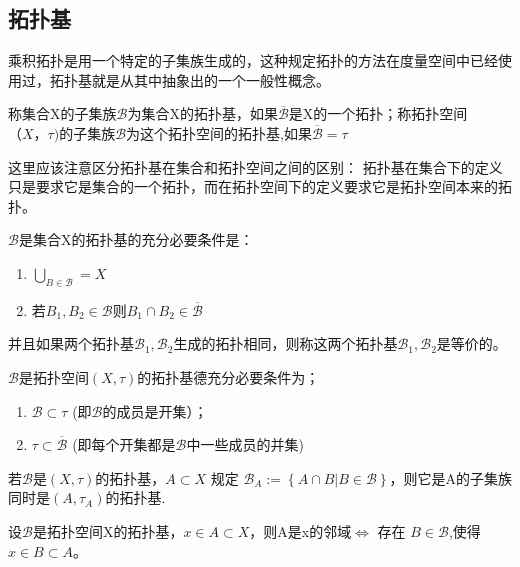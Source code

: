 \subsection*{拓扑基}
乘积拓扑是用一个特定的子集族生成的，这种规定拓扑的方法在度量空间中已经使用过，拓扑基就是从其中抽象出的一个一般性概念。
\begin{definition}
    称集合X的子集族\(\mathscr{B}\)为集合X的拓扑基，如果\(\overline{\mathscr{B}}\)是X的一个拓扑；称拓扑空间\(（X，\tau ) \)的子集族\(\mathscr{B}\)为这个拓扑空间的拓扑基,如果\(\overline{\mathscr{B}}= \tau\)
\end{definition}
\begin{note}
    这里应该注意区分拓扑基在集合和拓扑空间之间的区别： 拓扑基在集合下的定义只是要求它是集合的一个拓扑，而在拓扑空间下的定义要求它是拓扑空间本来的拓扑。
\end{note}
\begin{corollary}
    \(\mathscr{B}\)是集合X的拓扑基的充分必要条件是： 
    \begin{enumerate}
        \item \(\bigcup_{B \in \mathscr{B}} = X \) \\
        \item 若\(B_1,B_2 \in \mathscr{B} \text{则} B_1\cap B_2 \in \overline{\mathscr{B}}\)
    \end{enumerate}
\end{corollary}
并且如果两个拓扑基\(\mathscr{B}_1,\mathscr{B}_2\)生成的拓扑相同，则称这两个拓扑基\(\mathscr{B}_1,\mathscr{B}_2\)是等价的。
\begin{corollary}
    \(\mathscr{B}\)是拓扑空间\((X ,\tau )\)的拓扑基德充分必要条件为；
    \begin{enumerate}
        \item \(\mathscr{B} \subset \tau \) (即\(\mathscr{B}\)的成员是开集）；\\
        \item \(\tau \subset \overline{\mathscr{B}}\) (即每个开集都是\(\mathscr{B}\)中一些成员的并集)
    \end{enumerate}
\end{corollary}
\begin{corollary}
    若\(\mathscr{B}\)是\((X,\tau)\)的拓扑基，\(A \subset X\) 规定 \(\mathscr{B}_A := \left\{A \cap B | B \in \mathscr{B}\right\}\)，则它是A的子集族同时是\((A,\tau_A)\)的拓扑基.
\end{corollary}
\begin{theorem}
    设\(\mathscr{B}\)是拓扑空间X的拓扑基，\(x \in A \subset X \)，则A是x的邻域\(\Leftrightarrow\) 存在 \(B \in \mathscr{B}\),使得 \(x \in B \subset A \)。
\end{theorem}
